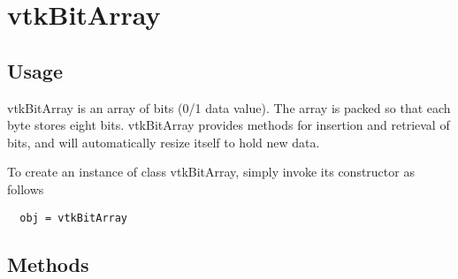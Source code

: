 \section{vtkBitArray}

\subsection{Usage}

 vtkBitArray is an array of bits (0/1 data value). The array is packed 
 so that each byte stores eight bits. vtkBitArray provides methods
 for insertion and retrieval of bits, and will automatically resize 
 itself to hold new data.

To create an instance of class vtkBitArray, simply
invoke its constructor as follows
\begin{verbatim}
  obj = vtkBitArray
\end{verbatim}
\subsection{Methods}


